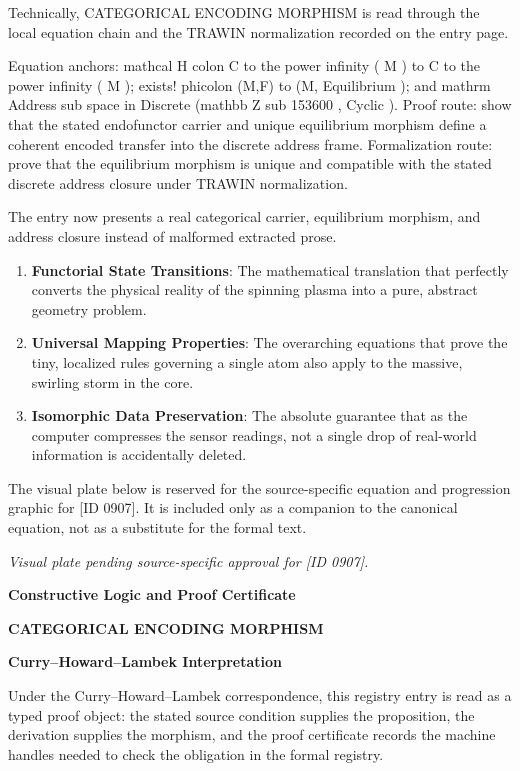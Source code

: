 Technically, CATEGORICAL ENCODING MORPHISM is read through the local equation chain and the TRAWIN normalization recorded on the entry page.

Equation anchors: mathcal H colon C to the power infinity ( M ) to C to the power infinity ( M ); exists! phicolon (M,F) to (M, Equilibrium ); and mathrm Address sub space in Discrete (mathbb Z sub 153600 , Cyclic ). Proof route: show that the stated endofunctor carrier and unique equilibrium morphism define a coherent encoded transfer into the discrete address frame. Formalization route: prove that the equilibrium morphism is unique and compatible with the stated discrete address closure under TRAWIN normalization.

The entry now presents a real categorical carrier, equilibrium morphism, and address closure instead of malformed extracted prose.
\endgroup

\begin{enumerate}[leftmargin=1.6em,itemsep=6pt,topsep=4pt]
\item \textbf{Functorial State Transitions}: The mathematical translation that perfectly converts the physical reality of the spinning plasma into a pure, abstract geometry problem.
\item \textbf{Universal Mapping Properties}: The overarching equations that prove the tiny, localized rules governing a single atom also apply to the massive, swirling storm in the core.
\item \textbf{Isomorphic Data Preservation}: The absolute guarantee that as the computer compresses the sensor readings, not a single drop of real-world information is accidentally deleted.
\end{enumerate}

\begingroup\footnotesize\sloppy
The visual plate below is reserved for the source-specific equation and progression graphic for [ID 0907]. It is included only as a companion to the canonical equation, not as a substitute for the formal text.
\par\endgroup
\begingroup\footnotesize\itshape
Visual plate pending source-specific approval for [ID 0907].
\par\endgroup

\clearpage
\begingroup\tzpsupportsetup
\noindent\textbf{\fontsize{10.8pt}{12.8pt}\selectfont [ID 0907] Constructive Logic and Proof Certificate}\par
\noindent\textbf{\fontsize{10pt}{12pt}\selectfont CATEGORICAL ENCODING MORPHISM}\par
\vspace{0.45em}
\begingroup
\footnotesize
\setlength{\parskip}{0.22em}
\setlength{\parindent}{0pt}
\noindent\textbf{Curry--Howard--Lambek Interpretation}\par
Under the Curry--Howard--Lambek correspondence, this registry entry is read as a typed proof
object: the stated source condition supplies the proposition, the derivation supplies the
morphism, and the proof certificate records the machine handles needed to check the obligation
in the formal registry.

